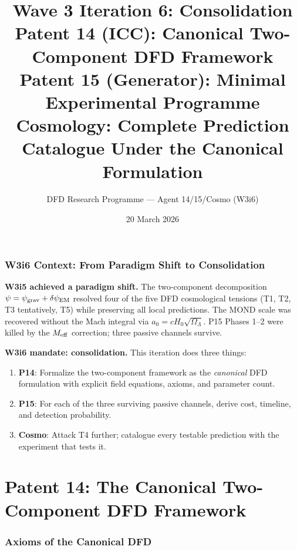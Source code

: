 \documentclass[11pt]{article}
\title{Wave 3 Iteration 6: Consolidation\\
\large Patent 14 (ICC): Canonical Two-Component DFD Framework\\
Patent 15 (Generator): Minimal Experimental Programme\\
Cosmology: Complete Prediction Catalogue Under the Canonical Formulation}
\author{DFD Research Programme --- Agent 14/15/Cosmo (W3i6)}
\date{20 March 2026}
\newcommand{\psigrav}{\psi_{\rm grav}}
\newcommand{\dpsiEM}{\delta\psi_{\rm EM}}
\newcommand{\aM}{a_0}
\newcommand{\Hzero}{H_0}
\newcommand{\Meff}{M_{\rm eff}}
\begin{document}
\maketitle
\tableofcontents
\newpage

\section*{W3i6 Context: From Paradigm Shift to Consolidation}

\noindent\textbf{W3i5 achieved a paradigm shift.} The two-component
decomposition $\psi = \psigrav + \dpsiEM$ resolved four of the five
DFD cosmological tensions (T1, T2, T3 tentatively, T5) while preserving
all local predictions. The MOND scale was recovered without the Mach
integral via $\aM = c\Hzero\sqrt{\Omega_\Lambda}$. P15 Phases 1--2
were killed by the $\Meff$ correction; three passive channels survive.

\noindent\textbf{W3i6 mandate: consolidation.} This iteration does three things:
\begin{enumerate}[nosep]
\item \textbf{P14}: Formalize the two-component framework as the
  \emph{canonical} DFD formulation with explicit field equations,
  axioms, and parameter count.
\item \textbf{P15}: For each of the three surviving passive channels,
  derive cost, timeline, and detection probability.
\item \textbf{Cosmo}: Attack T4 further; catalogue every testable
  prediction with the experiment that tests it.
\end{enumerate}

\part{Patent 14: The Canonical Two-Component DFD Framework}
\label{part:P14}

\section{Axioms of the Canonical DFD}
\label{sec:axioms}
\end{document}
